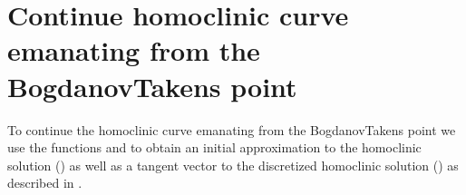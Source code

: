 \documentclass[letterpaper,10pt,english]{jupyterBook}
\begin{document}
\begin{sphinxVerbatim}[commandchars=\\\{\}]
\PYG{p}{[}\PYG{p}{]}
\end{sphinxVerbatim}


\section{Continue homoclinic curve emanating from the Bogdanov\sphinxhyphen{}Takens point}
\label{\detokenize{PredatorPrey:continue-homoclinic-curve-emanating-from-the-bogdanov-takens-point}}
\sphinxAtStartPar
To continue the homoclinic curve emanating from the Bogdanov\sphinxhyphen{}Takens point we
use the functions  and  to obtain an initial
approximation to the homoclinic solution () as well as a tangent vector
to the discretized homoclinic solution () as described in
{\hyperref[\detokenize{Morris-Lecar:initial-prediction-homoclinic-orbit}]{}}.

\begin{sphinxVerbatim}[commandchars=\\\{\}]
\PYG{p}{[}\PYG{p}{]}
\PYG{p}{[}\PYG{p}{]}
\end{sphinxVerbatim}
\end{document}

